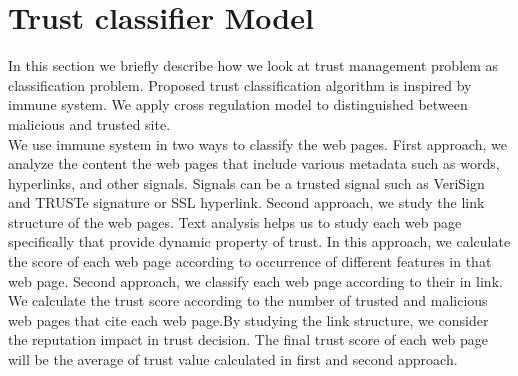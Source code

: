\documentclass{llncs}
\begin{document}
\section{Trust classifier Model }
In this section we briefly describe how we look at trust management problem as classification problem. Proposed trust classification algorithm is inspired by immune system. We apply cross regulation model \cite{carneiro} to distinguished between malicious and trusted site.\\
We use immune system in two ways to classify the web pages. First approach, we analyze the content the web pages that include various metadata such as words, hyperlinks, and other signals. Signals can be a trusted signal such as VeriSign and TRUSTe signature or SSL hyperlink. Second approach, we study the link structure of the web pages.  Text analysis helps us to study each web page specifically that provide dynamic property of trust. In this approach, we calculate the score of each web page according to occurrence of different features in that web page. Second approach, we classify each web page according to their in link. We calculate the trust score according to the number of trusted and malicious web pages that cite each web page.By studying the link structure, we consider the reputation impact in trust decision. 
The final trust score of each web page will be the average of trust value calculated in first and second approach. 
\end{document}
